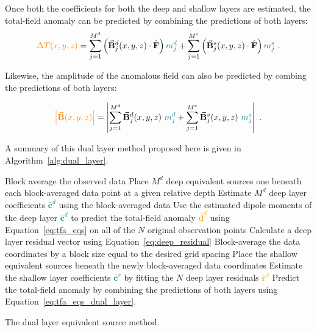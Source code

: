Once both the coefficients for both the deep and shallow layers are estimated, the total-field anomaly can be predicted by combining the predictions of both layers:
\begin{equation}
    \label{eq:tfa_eqs_dual_layer}
  \textcolor{orange}{\Delta T (x, y, z)} = \sum_{j=1}^{M^d} \left(\vec{\mathbf{B}}^d_j(x, y, z) \cdot \hat{\mathbf{F}}\right) \textcolor{teal}{m_j^d}
  +  \sum_{j=1}^{M^s} \left(\vec{\mathbf{B}}^s_j(x, y, z) \cdot \hat{\mathbf{F}}\right) \textcolor{teal}{m_j^s}
  \ .
\end{equation}

\noindent
Likewise, the amplitude of the anomalous field can also be predicted by combing the predictions of both layers:

\begin{equation}
  \textcolor{orange}{\left\lvert \vecbf{B}(x,y,z) \right\rvert} =
  \left\lvert \sum_{j=1}^{M^d} \vecbf{B}^d_{j}(x,y,z)\ \textcolor{teal}{m^d_j}
  +
  \sum_{j=1}^{M^s}  \vecbf{B}^s_{j}(x,y,z)\ \textcolor{teal}{m^s_j}
  \right\rvert
  \ .
\end{equation}

A summary of this dual layer method proposed here is given in Algorithm~\ref{alg:dual_layer}.

\begin{algorithm}[!h]
  Block average the observed data
  \;
  Place $M^d$ deep equivalent sources one beneath each block-averaged data point at a given relative depth
  \;
  Estimate $M^d$ deep layer coefficients \textcolor{teal}{$\bar{\mathbf{c}}^d$} using the block-averaged data
  \;
  Use the estimated dipole moments of the deep layer \textcolor{teal}{$\bar{\mathbf{c}}^d$} to predict the total-field anomaly \textcolor{orange}{$\bar{\mathbf{d}}^d$} using Equation~\ref{eq:tfa_eqs} on all of the $N$ original observation points
  \;
  Calculate a deep layer residual vector using Equation~\ref{eq:deep_residual}
  \;
  Block-average the data coordinates by a block size equal to the desired grid spacing
  \;
  Place the shallow equivalent sources beneath the newly block-averaged data coordinates
  \;
  Estimate the shallow layer coefficients \textcolor{teal}{$\bar{\mathbf{c}}^s$} by fitting the $N$ deep layer residuals \textcolor{orange}{$\bar{\mathbf{r}}^d$}
  \;
   Predict the total-field anomaly by combining the predictions of both layers using Equation~\ref{eq:tfa_eqs_dual_layer}.
  \BlankLine
  \caption{The dual layer equivalent source method.}
  \label{alg:dual_layer}
\end{algorithm}


